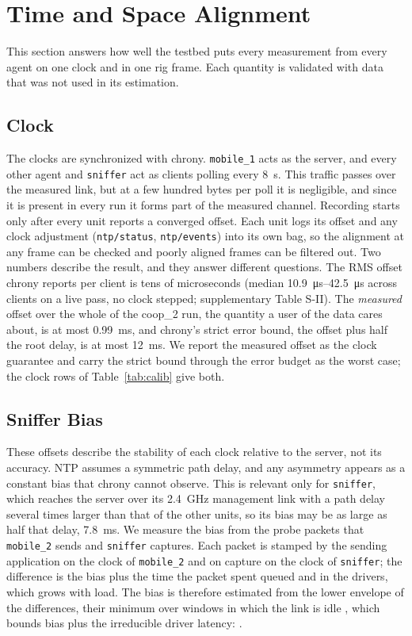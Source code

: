 \section{Time and Space Alignment}
\label{sec:alignment}
This section answers how well the testbed puts every measurement from
every agent on one clock and in one rig frame. Each quantity is
validated with data that was not used in its estimation.

\subsection{Clock}
\label{sec:clock}
The clocks are synchronized with chrony. \texttt{mobile\_1} acts as
the server, and every other agent and \texttt{sniffer} act as clients
polling every \SI{8}{\second}. This traffic passes over the measured
link, but at a few hundred bytes per poll it is negligible, and since
it is present in every run it forms part of the measured channel.
Recording starts only after every unit reports a converged offset.
Each unit logs its offset and any clock adjustment
(\texttt{ntp/status}, \texttt{ntp/events}) into its own bag, so the
alignment at any frame can be checked and poorly aligned frames can
be filtered out. Two numbers describe the result, and they answer
different questions. The RMS offset chrony reports per client is tens
of microseconds (median \SIrange{10.9}{42.5}{\micro\second} across
clients on a live pass, no clock stepped; supplementary Table S-II).
The \emph{measured} offset over the whole of the coop\_2 run, the
quantity a user of the data cares about, is at most
\SI{0.99}{\milli\second}, and chrony's strict error bound, the
offset plus half the root delay, is at most \SI{12}{\milli\second}.
We report the measured offset as the clock guarantee and carry the
strict bound through the error budget as the worst case; the clock
rows of Table~\ref{tab:calib} give both. 

\subsection{Sniffer Bias}
\label{sec:sniffer}
These offsets describe the stability of each clock relative to the
server, not its accuracy. NTP assumes a symmetric path delay, and any
asymmetry appears as a constant bias that chrony cannot observe. This
is relevant only for \texttt{sniffer}, which reaches the server over
its \SI{2.4}{\giga\hertz} management link with a path delay several
times larger than that of the other units, so its bias may be as large
as half that delay, \SI{7.8}{\milli\second}. We measure the bias
from the probe packets that \texttt{mobile\_2} sends and
\texttt{sniffer} captures. Each packet is stamped by the sending
application on the clock of \texttt{mobile\_2} and on capture on the
clock of \texttt{sniffer}; the difference is the bias plus the time the
packet spent queued and in the drivers, which grows with load. The bias
is therefore estimated from the lower envelope of the differences, their
minimum over windows in which the link is idle \cite{paxson1998calibrating},
which bounds bias plus the irreducible driver latency: .

